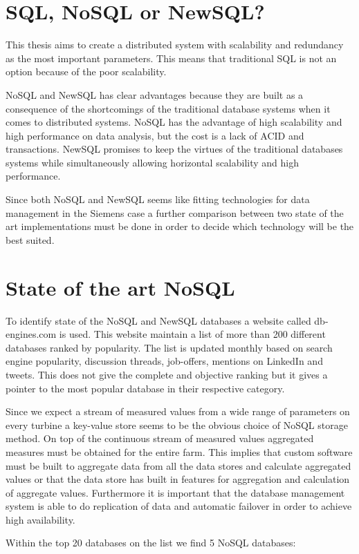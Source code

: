 \section{SQL, NoSQL or NewSQL?}
This thesis aims to create a distributed system with scalability and redundancy as the most important parameters.
This means that traditional SQL is not an option because of the poor scalability.

NoSQL and NewSQL has clear advantages because they are built as a consequence of the shortcomings of the traditional database systems when it comes to distributed systems.
NoSQL has the advantage of high scalability and high performance on data analysis, but the cost is a lack of ACID and transactions.
NewSQL promises to keep the virtues of the traditional databases systems while simultaneously allowing horizontal scalability and high performance.

Since both NoSQL and NewSQL seems like fitting technologies for data management in the Siemens case a further comparison between two state of the art implementations must be done in order to decide which technology will be the best suited.

\section{State of the art NoSQL}
To identify state of the NoSQL and NewSQL databases a website called db-engines.com\cite{db-engines} is used.
This website maintain a list of more than 200 different databases ranked by popularity. The list is updated monthly based on search engine popularity, discussion threads, job-offers, mentions on LinkedIn and tweets. This does not give the complete and objective ranking but it gives a pointer to the most popular database in their respective category.

Since we expect a stream of measured values from a wide range of parameters on every turbine a key-value store seems to be the obvious choice of NoSQL storage method. On top of the continuous stream of measured values aggregated measures must be obtained for the entire farm. This implies that custom software must be built to aggregate data from all the data stores and calculate aggregated values or that the data store has built in features for aggregation and calculation of aggregate values. Furthermore it is important that the database management system is able to do replication of data and automatic failover in order to achieve high availability.

Within the top 20 databases on the list we find 5 NoSQL databases:

